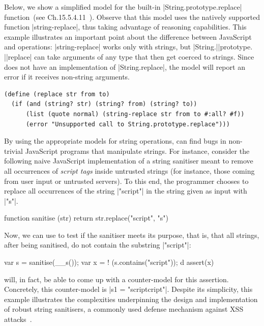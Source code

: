 Below, we show a simplified \rosette model for the built-in \jsinline|String.prototype.replace|
function~(see Ch.15.5.4.11~\cite{ecma}).
Observe that this model uses the natively supported function \schemeinline|string-replace|, 
thus taking advantage of \rosette reasoning capabilities.
This example illustrates an important point about the difference between JavaScript and
\rosette operations: \schemeinline|string-replace| works only with strings, but \jsinline|String.|\jsinline|prototype. |\jsinline|replace| can take arguments of any type that then get coerced to strings. Since \JSComp does not have an implementation of \jsinline|String.replace|, the \rosette model will report an error if it receives non-string arguments.
\begin{lstlisting}
(define (replace str from to)
  (if (and (string? str) (string? from) (string? to))
      (list (quote normal) (string-replace str from to #:all? #f))
      (error "Unsupported call to String.prototype.replace")))
\end{lstlisting}

By using the appropriate \rosette models for string operations, \jilette can find bugs in  
non-trivial JavaScript programs that manipulate strings. For instance, consider 
the following naive JavaScript implementation of a string sanitiser meant to remove 
all occurrences of \emph{script tags} inside untrusted strings (for instance, those coming 
from user input or untrusted servers).
To this end, the programmer chooses to 
replace all occurrences of the string \jsinline|"script"| in the string given 
as input with \jsinline|"s"|. 
\begin{lstjsex}
function sanitise (str) { return str.replace("script", "s") }
\end{lstjsex}
Now, we can use \jilette to test if the sanitiser meets its purpose, that is, that all
strings, after being sanitised, do not contain the substring \jsinline|"script"|:
\begin{lstjsex}
var s = sanitise(__s()); 
var x = ! (s.contains("script")); d
assert(x) 
\end{lstjsex}
\jilette will, in fact, be able to come up with a counter-model for this assertion. Concretely, this counter-model is \jsinline|s1 = "scriptcript"|. Despite its simplicity, this example illustrates the complexities underpinning the 
design and implementation of robust string sanitisers, a commonly  
used defense mechanism against XSS attacks~\cite{song}. 
 
 

 
 

%







